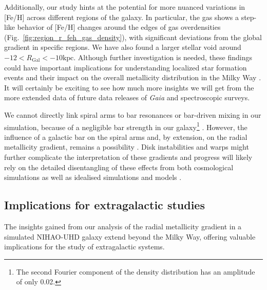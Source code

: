 \documentclass[twocolumn,apj,numberedappendix,appendixfloats]{openjournal}
\begin{document}
\begin{CJK*}{UTF8}{gbsn}
Additionally, our study hints at the potential for more nuanced variations in [Fe/H] across different regions of the galaxy. In particular, the gas shows a step-like behavior of [Fe/H] changes around the edges of gas overdensities (Fig.~\ref{fig:region_r_feh_gas_density}), with significant deviations from the global gradient in specific regions. We have also found a larger stellar void around $-12 < R_\mathrm{Gal} < -10\mathrm{kpc}$. Although further investigation is needed, these findings could have important implications for understanding localized star formation events and their impact on the overall metallicity distribution in the Milky Way \citep{Sanchez2014, SanchezBlazquez2014, Ho2015}. It will certainly be exciting to see how much more insights \citep{Poggio2021, Hackshaw2024} we will get from the more extended data of future data releases of \textit{Gaia} and spectroscopic surveys.

We cannot directly link spiral arms to bar resonances or bar-driven mixing in our simulation, because of a negligible bar strength in our galaxy\footnote{The second Fourier component of the density distribution has an amplitude of only 0.02.} \citep[but see][]{Minchev2010, DiMatteo2013}. However, the influence of a galactic bar on the spiral arms and, by extension, on the radial metallicity gradient, remains a possibility \citep[see again][]{Chen2023}. Disk instabilities and warps might further complicate the interpretation of these gradients and progress will likely rely on the detailed disentangling of these effects from both cosmological simulations as well as idealised simulations and models \citep{Minchev2013, Grand2015, Grand2016, Krumholz2018, Sharda2021, BlandHawthorn2024, TepperGarcia2024}.

\subsection{Implications for extragalactic studies} \label{sec:implications_extragalactic}

The insights gained from our analysis of the radial metallicity gradient in a simulated NIHAO-UHD galaxy extend beyond the Milky Way, offering valuable implications for the study of extragalactic systems.


\end{CJK*}
\end{document}
